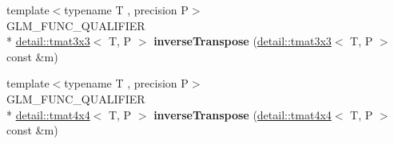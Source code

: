 \begin{DoxyCompactItemize}
\item 
\hypertarget{namespaceglm_a821bc03bbd402ee2f77ba43c17a9c24e}{{\footnotesize template$<$typename T , precision P$>$ }\\G\-L\-M\-\_\-\-F\-U\-N\-C\-\_\-\-Q\-U\-A\-L\-I\-F\-I\-E\-R \\*
\hyperlink{structglm_1_1detail_1_1tmat3x3}{detail\-::tmat3x3}$<$ T, P $>$ {\bfseries inverse\-Transpose} (\hyperlink{structglm_1_1detail_1_1tmat3x3}{detail\-::tmat3x3}$<$ T, P $>$ const \&m)}\label{namespaceglm_a821bc03bbd402ee2f77ba43c17a9c24e}

\item 
\hypertarget{namespaceglm_aaf03d778a4023049e562c382ad880d56}{{\footnotesize template$<$typename T , precision P$>$ }\\G\-L\-M\-\_\-\-F\-U\-N\-C\-\_\-\-Q\-U\-A\-L\-I\-F\-I\-E\-R \\*
\hyperlink{structglm_1_1detail_1_1tmat4x4}{detail\-::tmat4x4}$<$ T, P $>$ {\bfseries inverse\-Transpose} (\hyperlink{structglm_1_1detail_1_1tmat4x4}{detail\-::tmat4x4}$<$ T, P $>$ const \&m)}\label{namespaceglm_aaf03d778a4023049e562c382ad880d56}


\end{DoxyCompactItemize}
